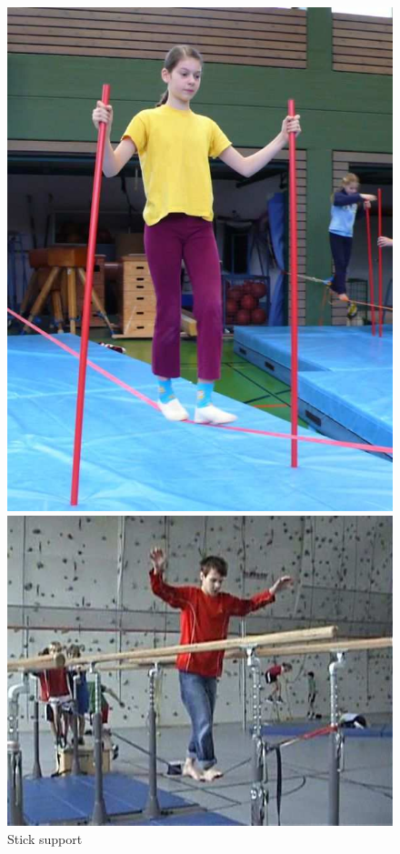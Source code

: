 \begin{figure}[htb]
	\centering
	\begin{minipage}[t]{0.25\linewidth}
		\centering
		\includegraphics[width=1\linewidth]{Pictures/slacklineHelpSticks}
		\caption{Stick support \cite{Kroiss2007-ab}}
		\label{fig:slacklineHelpSticks}
	\end{minipage}
	\hfill
	\begin{minipage}[t]{0.38\linewidth}
		\centering
		\includegraphics[width=1\linewidth]{Pictures/slacklineHelpBar}

\end{minipage}
\end{figure}
